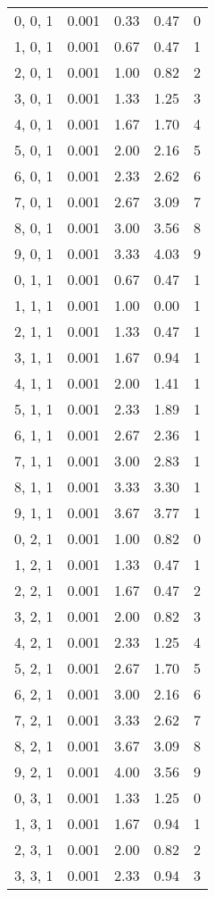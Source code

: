 \documentclass[12pt]{article}
\begin{document}
\begin{tabular}{c || c || c | c | c}
0, 0, 1 & 0.001 & 0.33 & 0.47 & 0 \\
1, 0, 1 & 0.001 & 0.67 & 0.47 & 1 \\
2, 0, 1 & 0.001 & 1.00 & 0.82 & 2 \\
3, 0, 1 & 0.001 & 1.33 & 1.25 & 3 \\
4, 0, 1 & 0.001 & 1.67 & 1.70 & 4 \\
5, 0, 1 & 0.001 & 2.00 & 2.16 & 5 \\
6, 0, 1 & 0.001 & 2.33 & 2.62 & 6 \\
7, 0, 1 & 0.001 & 2.67 & 3.09 & 7 \\
8, 0, 1 & 0.001 & 3.00 & 3.56 & 8 \\
9, 0, 1 & 0.001 & 3.33 & 4.03 & 9 \\
0, 1, 1 & 0.001 & 0.67 & 0.47 & 1 \\
1, 1, 1 & 0.001 & 1.00 & 0.00 & 1 \\
2, 1, 1 & 0.001 & 1.33 & 0.47 & 1 \\
3, 1, 1 & 0.001 & 1.67 & 0.94 & 1 \\
4, 1, 1 & 0.001 & 2.00 & 1.41 & 1 \\
5, 1, 1 & 0.001 & 2.33 & 1.89 & 1 \\
6, 1, 1 & 0.001 & 2.67 & 2.36 & 1 \\
7, 1, 1 & 0.001 & 3.00 & 2.83 & 1 \\
8, 1, 1 & 0.001 & 3.33 & 3.30 & 1 \\
9, 1, 1 & 0.001 & 3.67 & 3.77 & 1 \\
0, 2, 1 & 0.001 & 1.00 & 0.82 & 0 \\
1, 2, 1 & 0.001 & 1.33 & 0.47 & 1 \\
2, 2, 1 & 0.001 & 1.67 & 0.47 & 2 \\
3, 2, 1 & 0.001 & 2.00 & 0.82 & 3 \\
4, 2, 1 & 0.001 & 2.33 & 1.25 & 4 \\
5, 2, 1 & 0.001 & 2.67 & 1.70 & 5 \\
6, 2, 1 & 0.001 & 3.00 & 2.16 & 6 \\
7, 2, 1 & 0.001 & 3.33 & 2.62 & 7 \\
8, 2, 1 & 0.001 & 3.67 & 3.09 & 8 \\
9, 2, 1 & 0.001 & 4.00 & 3.56 & 9 \\
0, 3, 1 & 0.001 & 1.33 & 1.25 & 0 \\
1, 3, 1 & 0.001 & 1.67 & 0.94 & 1 \\
2, 3, 1 & 0.001 & 2.00 & 0.82 & 2 \\
3, 3, 1 & 0.001 & 2.33 & 0.94 & 3 \\

\end{tabular}
\end{document}
